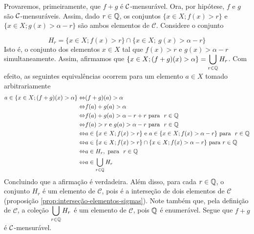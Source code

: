 \begin{prova}
    Provaremos, primeiramente, que $f+g$ é $\operatorname{\mathcal{C}}$-mensurável.
    Ora, por hipótese, $f$ e $g$ são $\operatorname{\mathcal{C}}$-mensuráveis. 
    Assim, dado $r \in \operatorname{\mathbb{Q}}$, os conjuntos $\{x \in X; f(x) > r\}$ e 
        $\{x \in X; g(x) > \alpha -r\}$ são ambos elementos de $\mathcal{C}$.
        Considere o conjunto  
        
        $$H_r = \{x \in X; f(x) > r\} \cap \{x \in X;\ g(x) > \alpha -r\}$$
        Isto é, o conjunto dos elementos $x \in X$ tal que $f(x) 
        > r$ e $g(x) >\alpha -r$ simultaneamente.
        Assim, afirmamos que $\{x \in X; (f+g)(x) > \alpha\} = \displaystyle \bigcup_{r \in \operatorname{\mathbb{Q}}} H_r$. Com efeito, as seguintes equivalências ocorrem para um elemento $a \in X$ tomado arbitrariamente
        \begin{align*}
            a \in \{x \in X; (f+g)(x) > \alpha\} 
            \Leftrightarrow  & (f+g)(a) >\alpha \\
            \Leftrightarrow & f(a) +g(a) > \alpha \\
            \Leftrightarrow & f(a) + g(a) > \alpha -r + r\ \textrm{para } \ r \in \Q\\
            \Leftrightarrow & f(a) > r \textrm{\ e\ } g(a) > \alpha -r\ \textrm{para  } \ r \in \Q\\
            \Leftrightarrow & a \in \{x \in X; f(x) > r\} \textrm{\ e\ } a \in \{x \in X; f(x) > \alpha - r\}\  \textrm{para  } \ r \in \Q\\
            \Leftrightarrow & a \in \{x \in X; f(x) > r\} \cap \{x \in X; f(x) > \alpha - r\}\  \textrm{para  }  r \in \Q\\
            \Leftrightarrow & a \in H_r,\ \textrm{para  } \ r \in \Q\\
            \Leftrightarrow &a \in \bigcup_{r \in \Q} H_r
        \end{align*}
    Concluindo que a afirmação é verdadeira. 
    Além disso, para cada $r \in \operatorname{\mathbb{Q}}$, o conjunto $H_r$ é um elemento de $\mathcal{C}$, pois é  a interseção de dois elementos de $\mathcal{C}$ (proposição \ref{prop:interseção-elementos-sigmas}).
    Note também que, pela definição de $\mathcal{C}$, a coleção $\displaystyle \bigcup_{r \in \operatorname{\mathbb{Q}}} H_r$ é um elemento de $\mathcal{C}$, pois $\operatorname{\mathbb{Q}}$ é enumerável.
    Segue que $f+g$ é $\operatorname{\mathcal{C}}$-mensurável.


\end{prova}
